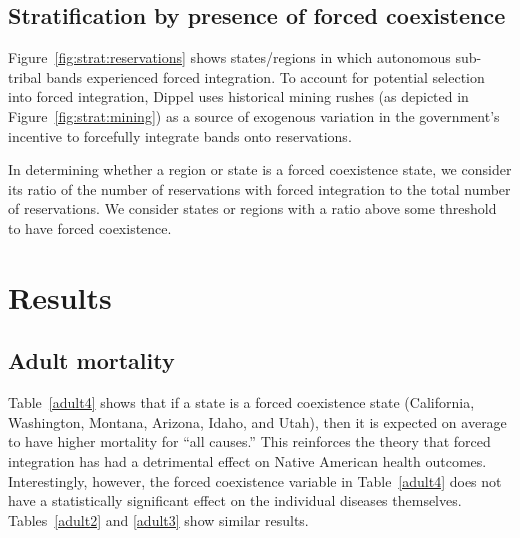 \documentclass[12pt]{article}
\begin{document}
\subsection{Stratification by presence of forced coexistence}
Figure~\ref{fig:strat:reservations} shows states/regions in which autonomous sub-tribal bands experienced forced integration. 
To account for potential selection into forced integration, Dippel uses historical mining rushes (as depicted in Figure~\ref{fig:strat:mining}) as a source of exogenous variation in the government's incentive to forcefully integrate bands onto reservations. 

In determining whether a region or state is a forced coexistence state, we consider its ratio of the number of reservations with forced integration to the total number of reservations.
We consider states or regions with a ratio above some threshold to have forced coexistence.





\section{Results}

\subsection{Adult mortality}
Table~\ref{adult4} shows that if a state is a forced coexistence state (California, Washington, Montana, Arizona, Idaho, and Utah), then it is expected on average to have higher mortality for ``all causes.'' 
This reinforces the theory that forced integration has had a detrimental effect on Native American health outcomes. 
Interestingly, however, the forced coexistence variable in Table~\ref{adult4} does not have a statistically significant effect on the individual diseases themselves. 
Tables~\ref{adult2} and \ref{adult3} show similar results.
\end{document}
